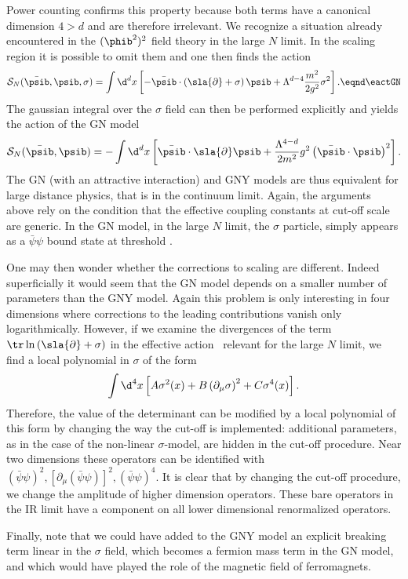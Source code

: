 Power counting confirms this property because both terms have a
canonical dimension $4>d$ and are therefore irrelevant.
  We recognize a situation already encountered in
the $(\phib^2)^2$ field theory in the large $N$ limit. In the scaling region
it is possible to omit them and one then finds the action
$${\cal S}_N (\bar \psib, \psib,\sigma )=\int \d^d x \left[-
\bar\psib\cdot \left(\sla{\partial}+\sigma \right) \psib
+\Lambda^{d-4}{ m^2\over2g^2} \sigma^2 \right].\eqnd\eactGN $$
The gaussian integral over the $\sigma$ field can then  be performed explicitly
and yields the action of the GN model
$${\cal S}_N (\bar \psib, \psib )=-\int\d^d x  \left[\bar\psib\cdot
\sla{\partial} \psib +{\Lambda^{4-d} \over
2m^2}g^2\left(\bar\psib\cdot \psib \right)^2 \right].$$ The GN
(with an attractive interaction) and GNY models are thus
equivalent for  large distance physics, that is in the continuum
limit. Again, the arguments above rely on the condition that the
effective coupling constants at cut-off scale are generic. In the
GN model, in the large $N$ limit, the $\sigma$ particle, simply
appears as a $ \bar\psi\psi$ bound state at threshold  .\par
One may
then wonder whether the corrections to scaling are different.
Indeed superficially it would seem that the GN model depends on a
smaller number of parameters than the GNY model. Again this
problem is only interesting in four dimensions where corrections
to the leading contributions vanish only logarithmically. However,
if we examine the divergences of the term $\tr\ln
\left(\sla{\partial}+\sigma \right)$ in the effective action
\eactefGN\ relevant for the large $N$ limit, we find a local
polynomial in $\sigma$ of the form
$$\int\d^4x\left[A \sigma^2(x)+B\left(\partial_{\mu}\sigma\right)^2 +C
\sigma^4(x)\right].$$ Therefore, the value of the determinant can
be modified by a local polynomial of this form by changing the way
the cut-off is implemented: additional parameters, as in the case
of the non-linear $\sigma$-model, are hidden in the cut-off
procedure. Near two dimensions these operators can be identified
with $(\bar\psi\psi)^2, [\partial_{\mu} (\bar\psi\psi)]^2,
(\bar\psi\psi)^4$. It is clear that by changing the cut-off
procedure, we change the amplitude of higher dimension operators.
These bare operators in the IR limit have a component on all lower
dimensional renormalized operators.  \par Finally, note that we
could have added to the GNY model an explicit breaking term linear
in the $\sigma$ field, which becomes a fermion mass term in the GN
model, and which would have played the role of the magnetic field
of ferromagnets.
%
